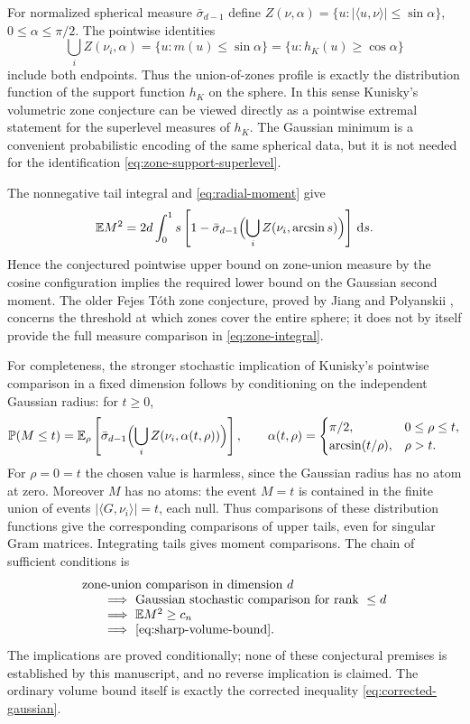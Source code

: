 \documentclass[10pt,reqno]{amsart}
\theoremstyle{definition}
\theoremstyle{remark}
\newcommand{\E}{\mathbb E}
\newcommand{\Prob}{\mathbb P}
\newcommand{\dd}{\,\mathrm d}
\newcommand{\ip}[2]{\langle #1,#2\rangle}
\begin{document}
For normalized spherical measure $\bar\sigma_{d-1}$ define
$Z(\nu,\alpha)=\{u:|\ip{u}{\nu}|\le\sin\alpha\}$, $0\le\alpha\le\pi/2$.
The pointwise identities
\begin{equation}\label{eq:zone-support-superlevel}
\bigcup_i Z(\nu_i,\alpha)=\{u:m(u)\le\sin\alpha\}
=\{u:h_K(u)\ge\cos\alpha\}
\end{equation}
include both endpoints. Thus the union-of-zones profile is exactly the distribution function of the support function $h_K$ on the sphere. In this sense Kunisky's volumetric zone conjecture can be viewed directly as a pointwise extremal statement for the superlevel measures of $h_K$. The Gaussian minimum is a convenient probabilistic encoding of the same spherical data, but it is not needed for the identification \eqref{eq:zone-support-superlevel}.

The nonnegative tail integral and \eqref{eq:radial-moment} give
\begin{equation}\label{eq:zone-integral}
\E M^2=2d\int_0^1s\left[1-\bar\sigma_{d-1}\Bigl(\bigcup_iZ(\nu_i,\arcsin s)\Bigr)\right]\dd s.
\end{equation}
Hence the conjectured pointwise upper bound on zone-union measure by the cosine configuration implies the required lower bound on the Gaussian second moment. The older Fejes T\'oth zone conjecture, proved by Jiang and Polyanskii \cite{JiangPolyanskii}, concerns the threshold at which zones cover the entire sphere; it does not by itself provide the full measure comparison in \eqref{eq:zone-integral}.

For completeness, the stronger stochastic implication of Kunisky's pointwise comparison in a fixed dimension follows by conditioning on the independent Gaussian radius: for $t\ge0$,
\[
\Prob(M\le t)=\E_\rho\left[\bar\sigma_{d-1}\Bigl(\bigcup_i
Z(\nu_i,\alpha(t,\rho))\Bigr)\right],\qquad
\alpha(t,\rho)=
\begin{cases}\pi/2,&0\le\rho\le t,\\ \arcsin(t/\rho),&\rho>t.\end{cases}
\]
For $\rho=0=t$ the chosen value is harmless, since the Gaussian radius has no atom at zero. Moreover $M$ has no atoms: the event $M=t$ is contained in the finite union of events $|\ip{G}{\nu_i}|=t$, each null. Thus comparisons of these distribution functions give the corresponding comparisons of upper tails, even for singular Gram matrices. Integrating tails gives moment comparisons. The chain of sufficient conditions is
\[
\begin{array}{l}
\text{zone-union comparison in dimension }d\\
\qquad\Longrightarrow\ \text{Gaussian stochastic comparison for rank }\le d\\
\qquad\Longrightarrow\ \E M^2\ge c_n\\
\qquad\Longrightarrow\ \eqref{eq:sharp-volume-bound}.
\end{array}
\]
The implications are proved conditionally; none of these conjectural premises is established by this manuscript, and no reverse implication is claimed. The ordinary volume bound itself is exactly the corrected inequality \eqref{eq:corrected-gaussian}.
\end{document}
